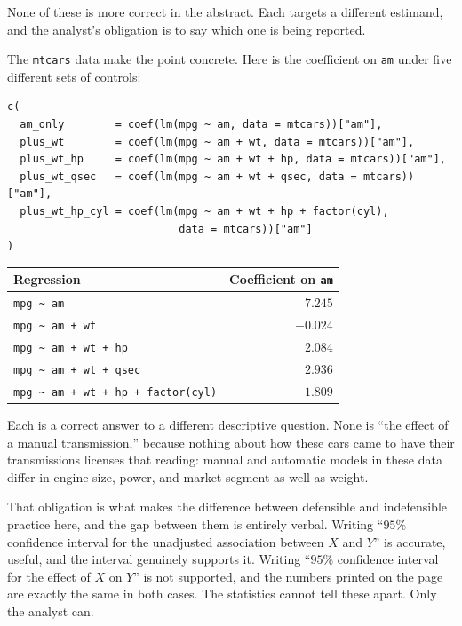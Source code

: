 \documentclass[11pt]{report}
\begin{document}
None of these is more correct in the abstract. Each targets a different estimand, and the analyst's obligation is to say which one is being reported.

The \texttt{mtcars} data make the point concrete. Here is the coefficient on \texttt{am} under five different sets of controls:

\begin{lstlisting}
c(
  am_only        = coef(lm(mpg ~ am, data = mtcars))["am"],
  plus_wt        = coef(lm(mpg ~ am + wt, data = mtcars))["am"],
  plus_wt_hp     = coef(lm(mpg ~ am + wt + hp, data = mtcars))["am"],
  plus_wt_qsec   = coef(lm(mpg ~ am + wt + qsec, data = mtcars))["am"],
  plus_wt_hp_cyl = coef(lm(mpg ~ am + wt + hp + factor(cyl),
                           data = mtcars))["am"]
)
\end{lstlisting}

\begin{center}
\begin{tabular}{lr}
\toprule
Regression & Coefficient on \texttt{am}\\
\midrule
\texttt{mpg \textasciitilde{} am} & \(7.245\)\\
\texttt{mpg \textasciitilde{} am + wt} & \(-0.024\)\\
\texttt{mpg \textasciitilde{} am + wt + hp} & \(2.084\)\\
\texttt{mpg \textasciitilde{} am + wt + qsec} & \(2.936\)\\
\texttt{mpg \textasciitilde{} am + wt + hp + factor(cyl)} & \(1.809\)\\
\bottomrule
\end{tabular}
\end{center}

Each is a correct answer to a different descriptive question. None is ``the effect of a manual transmission,'' because nothing about how these cars came to have their transmissions licenses that reading: manual and automatic models in these data differ in engine size, power, and market segment as well as weight.

That obligation is what makes the difference between defensible and indefensible practice here, and the gap between them is entirely verbal. Writing ``\(95\%\) confidence interval for the unadjusted association between \(X\) and \(Y\)'' is accurate, useful, and the interval genuinely supports it. Writing ``\(95\%\) confidence interval for the effect of \(X\) on \(Y\)'' is not supported, and the numbers printed on the page are exactly the same in both cases. The statistics cannot tell these apart. Only the analyst can.
\end{document}

